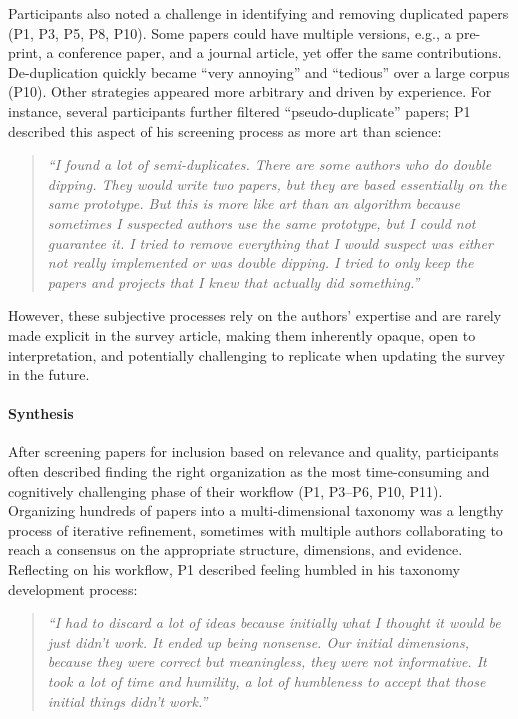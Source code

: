 Participants also noted a challenge in identifying and removing duplicated papers (P1, P3, P5, P8, P10). Some papers could have multiple versions, e.g., a pre-print, a conference paper, and a journal article, yet offer the same contributions. De-duplication quickly became ``very annoying'' and ``tedious'' over a large corpus (P10). Other strategies appeared more arbitrary and driven by experience. For instance, several participants further filtered ``pseudo-duplicate'' papers; P1 described this aspect of his screening process as more art than science:
\begin{quote}
    \textit{``I found a lot of semi-duplicates. There are some authors who do double dipping. They would write two papers, but they are based essentially on the same prototype. But this is more like art than an algorithm because sometimes I suspected authors use the same prototype, but I could not guarantee it. I tried to remove everything that I would suspect was either not really implemented or was double dipping. I tried to only keep the papers and projects that I knew that actually did something.''}
\end{quote}
However, these subjective processes rely on the authors' expertise and are rarely made explicit in the survey article, making them inherently opaque, open to interpretation, and potentially challenging to replicate when updating the survey in the future.

\paragraph{\textbf{Synthesis}}
After screening papers for inclusion based on relevance and quality, participants often described finding the right organization as the most time-consuming and cognitively challenging phase of their workflow (P1, P3--P6, P10, P11). Organizing hundreds of papers into a multi-dimensional taxonomy was a lengthy process of iterative refinement, sometimes with multiple authors collaborating to reach a consensus on the appropriate structure, dimensions, and evidence. Reflecting on his workflow, P1 described feeling humbled in his taxonomy development process:
\begin{quote}
    \textit{``I had to discard a lot of ideas because initially what I thought it would be just didn't work. It ended up being nonsense. Our initial dimensions, because they were correct but meaningless, they were not informative. It took a lot of time and humility, a lot of humbleness to accept that those initial things didn't work.''}
\end{quote}

